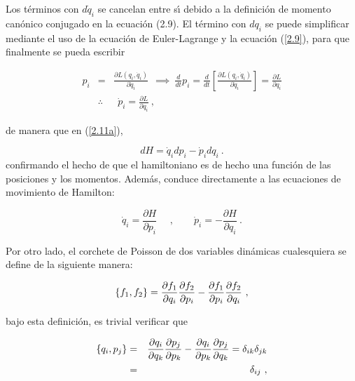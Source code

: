 Los t\'{e}rminos con $d\dot{q}_{i}$ se cancelan entre s\'{\i} debido a la definici\'{o}n de momento can\'{o}nico conjugado en la ecuaci\'{o}n (2.9). El t\'{e}rmino con $dq_{i}$ se puede simplificar mediante el uso de la ecuaci\'{o}n de Euler-Lagrange y la ecuaci\'{o}n (\ref{2.9}), para que finalmente se pueda escribir

\begin{eqnarray*}
p_{i} &=&\frac{\partial L(q_{i},\dot{q}_{i})}{\partial \dot{q}_{i}}~\ \implies ~\frac{d}{dt}p_{i}=\frac{d}{dt}\left[ \frac{\partial L(q_{i},\dot{q}_{i})}{\partial \dot{q}_{i}}\right] =\frac{\partial L}{\partial q_{i}} \\
&\therefore &~\ \dot{p}_{i}=\frac{\partial L}{\partial q_{i}}~,
\end{eqnarray*}

\bigskip de manera que en (\ref{2.11a}),

\begin{equation}
dH=\dot{q}_{i}dp_{i}-\dot{p}_{i}dq_{i}~.  \label{2.12}
\end{equation}%
confirmando el hecho de que el hamiltoniano es de hecho una funci\'{o}n de
las posiciones y los momentos. Adem\'{a}s, conduce directamente a las
ecuaciones de movimiento de Hamilton:

\begin{equation}
\dot{q}_{i}=\frac{\partial H}{\partial p_{i}}~\ \ \ ~\ ,\qquad \dot{p}_{i}=-%
\frac{\partial H}{\partial q_{i}}~.  \label{2.13}
\end{equation}

\bigskip

Por otro lado, el corchete de Poisson de dos variables din\'{a}micas
cualesquiera se define de la siguiente manera:

\begin{equation}
\left\{ f_{1},f_{2}\right\} =\frac{\partial f_{1}}{\partial q_{i}}\frac{%
\partial f_{2}}{\partial p_{i}}-\frac{\partial f_{1}}{\partial p_{i}}\frac{%
\partial f_{2}}{\partial q_{i}}~,  \label{2.14}
\end{equation}

\noindent
bajo esta definici\'{o}n, es trivial verificar que

\begin{eqnarray*}
\left\{ q_{i},p_{j}\right\}  &=&\frac{\partial q_{i}}{\partial q_{k}}\frac{%
\partial p_{j}}{\partial p_{k}}-\frac{\partial q_{i}}{\partial p_{k}}\frac{%
\partial p_{j}}{\partial q_{k}}=\delta _{ik}\delta _{jk} \\
&=&\delta _{ij}~,
\end{eqnarray*}

